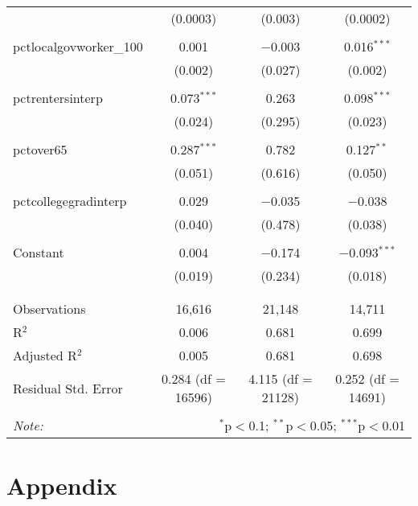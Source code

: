 \documentclass[]{article}
\begin{document}
\begin{table}[!htbp]
\begin{tabular}{@{\extracolsep{5pt}}lccc}
  & (0.0003) & (0.003) & (0.0002) \\ 
  & & & \\ 
 pctlocalgovworker\_100 & 0.001 & $-$0.003 & 0.016$^{***}$ \\ 
  & (0.002) & (0.027) & (0.002) \\ 
  & & & \\ 
 pctrentersinterp & 0.073$^{***}$ & 0.263 & 0.098$^{***}$ \\ 
  & (0.024) & (0.295) & (0.023) \\ 
  & & & \\ 
 pctover65 & 0.287$^{***}$ & 0.782 & 0.127$^{**}$ \\ 
  & (0.051) & (0.616) & (0.050) \\ 
  & & & \\ 
 pctcollegegradinterp & 0.029 & $-$0.035 & $-$0.038 \\ 
  & (0.040) & (0.478) & (0.038) \\ 
  & & & \\ 
 Constant & 0.004 & $-$0.174 & $-$0.093$^{***}$ \\ 
  & (0.019) & (0.234) & (0.018) \\ 
  & & & \\ 
\hline \\[-1.8ex] 
Observations & 16,616 & 21,148 & 14,711 \\ 
R$^{2}$ & 0.006 & 0.681 & 0.699 \\ 
Adjusted R$^{2}$ & 0.005 & 0.681 & 0.698 \\ 
Residual Std. Error & 0.284 (df = 16596) & 4.115 (df = 21128) & 0.252 (df = 14691) \\ 
\hline 
\hline \\[-1.8ex] 
\textit{Note:}  & \multicolumn{3}{r}{$^{*}$p$<$0.1; $^{**}$p$<$0.05; $^{***}$p$<$0.01} \\ 
\end{tabular} 
\end{table}

\hypertarget{appendix-1}{%
\section{Appendix}\label{appendix-1}}
\end{document}
